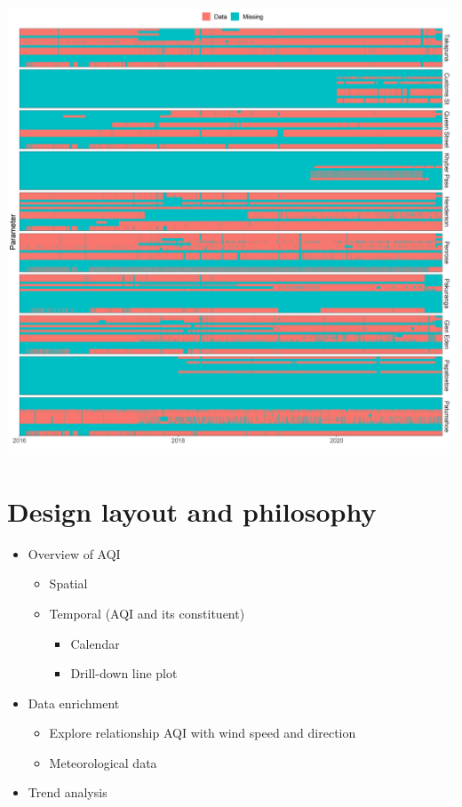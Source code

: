 \documentclass{aucklandthesis}
\begin{document}
\begin{center}\includegraphics[width=1\linewidth]{img/missing} \end{center}

\hypertarget{ch:design}{%
\chapter{Design layout and philosophy}\label{ch:design}}

\begin{itemize}
\tightlist
\item
  Overview of AQI

  \begin{itemize}
  \tightlist
  \item
    Spatial
  \item
    Temporal (AQI and its constituent)

    \begin{itemize}
    \tightlist
    \item
      Calendar
    \item
      Drill-down line plot
    \end{itemize}
  \end{itemize}
\item
  Data enrichment

  \begin{itemize}
  \tightlist
  \item
    Explore relationship AQI with wind speed and direction
  \item
    Meteorological data
  \end{itemize}
\item
  Trend analysis
\end{itemize}
\end{document}
